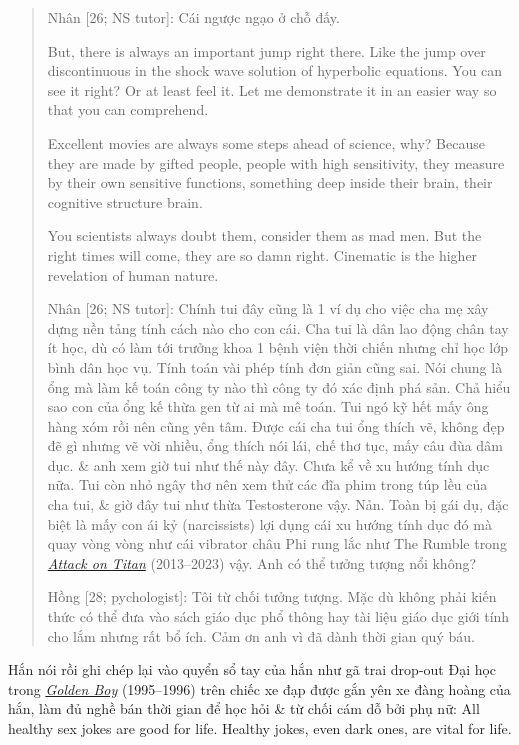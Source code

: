 \documentclass[12pt,oneside]{book}
\begin{document}
\begin{quote}
	{\sf Nhân [26; NS tutor]}: Cái ngược ngạo ở chỗ đấy. 
	
	But, there is always an important jump right there. Like the jump over discontinuous in the shock wave solution of hyperbolic equations. You can see it right? Or at least feel it. Let me demonstrate it in an easier way so that you can comprehend.
	
	Excellent movies are always some steps ahead of science, why? Because they are made by gifted people, people with high sensitivity, they measure by their own sensitive functions, something deep inside their brain, their cognitive structure brain.
	
	You scientists always doubt them, consider them as mad men. But the right times will come, they are so damn right. Cinematic is the higher revelation of human nature.
	
	{\sf Nhân [26; NS tutor]}: Chính tui đây cũng là 1 ví dụ cho việc cha mẹ xây dựng nền tảng tính cách nào cho con cái. Cha tui là dân lao động chân tay ít học, dù có làm tới trưởng khoa 1 bệnh viện thời chiến nhưng chỉ học lớp bình dân học vụ. Tính toán vài phép tính đơn giản cũng sai. Nói chung là ổng mà làm kế toán công ty nào thì công ty đó xác định phá sản. Chả hiểu sao con của ổng kế thừa gen từ ai mà mê toán. Tui ngó kỹ hết mấy ông hàng xóm rồi nên cũng yên tâm. Được cái cha tui ổng thích vẽ, không đẹp đẽ gì nhưng vẽ vời nhiều, ổng thích nói lái, chế thơ tục, mấy câu đùa dâm dục. \& anh xem giờ tui như thế này đây. Chưa kể về xu hướng tính dục nữa. Tui còn nhỏ ngây thơ nên xem thử các đĩa phim trong túp lều của cha tui, \& giờ đây tui như thừa Testosterone vậy. Nản. Toàn bị gái dụ, đặc biệt là mấy con ái kỷ (narcissists) lợi dụng cái xu hướng tính dục đó mà quay vòng vòng như cái vibrator châu Phi rung lắc như The Rumble trong \href{https://www.imdb.com/title/tt2560140}{\it Attack on Titan} (2013--2023) vậy. Anh có thể tưởng tượng nổi không?
		
	{\sf Hồng [28; pychologist]}: Tôi từ chối tưởng tượng. Mặc dù không phải kiến thức có thể đưa vào sách giáo dục phổ thông hay tài liệu giáo dục giới tính cho lắm nhưng rất bổ ích. Cảm ơn anh vì đã dành thời gian quý báu.
\end{quote}
Hắn nói rồi ghi chép lại vào quyển sổ tay của hắn như gã trai drop-out Đại học trong \href{https://www.imdb.com/title/tt0159145/}{\it Golden Boy} (1995--1996) trên chiếc xe đạp được gắn yên xe đàng hoàng của hắn, làm đủ nghề bán thời gian để học hỏi \& từ chối cám dỗ bởi phụ nữ: All healthy sex jokes are good for life. Healthy jokes, even dark ones, are vital for life.
\end{document}
